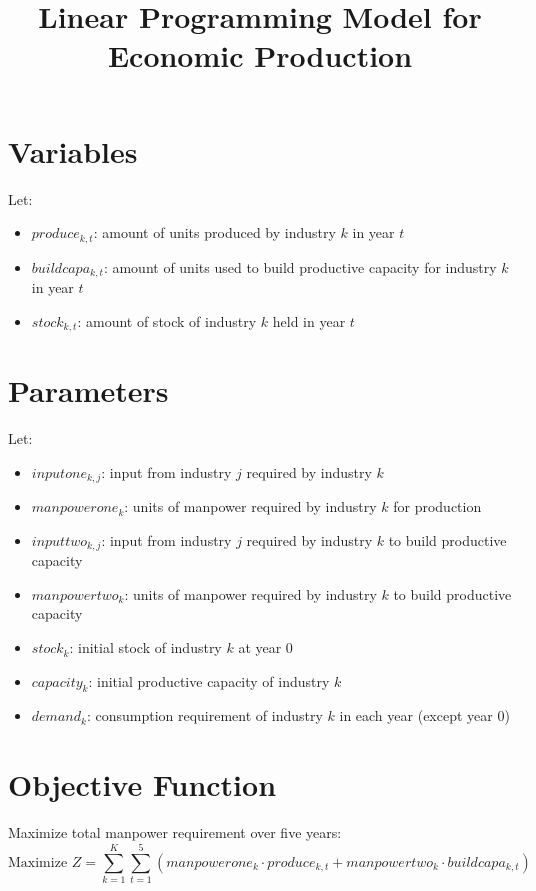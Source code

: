 \documentclass{article}
\begin{document}
\title{Linear Programming Model for Economic Production}
\author{}
\date{}
\maketitle

\section*{Variables}
Let:
\begin{itemize}
    \item \( produce_{k, t} \): amount of units produced by industry \( k \) in year \( t \)
    \item \( buildcapa_{k, t} \): amount of units used to build productive capacity for industry \( k \) in year \( t \)
    \item \( stock_{k, t} \): amount of stock of industry \( k \) held in year \( t \)
\end{itemize}

\section*{Parameters}
Let:
\begin{itemize}
    \item \( inputone_{k, j} \): input from industry \( j \) required by industry \( k \)
    \item \( manpowerone_{k} \): units of manpower required by industry \( k \) for production
    \item \( inputtwo_{k, j} \): input from industry \( j \) required by industry \( k \) to build productive capacity
    \item \( manpowertwo_{k} \): units of manpower required by industry \( k \) to build productive capacity
    \item \( stock_{k} \): initial stock of industry \( k \) at year 0
    \item \( capacity_{k} \): initial productive capacity of industry \( k \)
    \item \( demand_{k} \): consumption requirement of industry \( k \) in each year (except year 0)
\end{itemize}

\section*{Objective Function}
Maximize total manpower requirement over five years:
\[
\text{Maximize } Z = \sum_{k=1}^{K} \sum_{t=1}^{5} (manpowerone_{k} \cdot produce_{k, t} + manpowertwo_{k} \cdot buildcapa_{k, t})
\]
\end{document}
